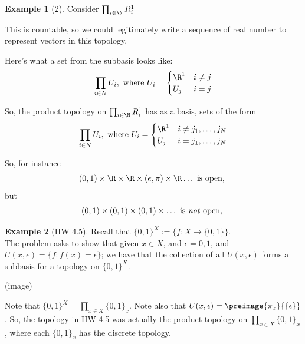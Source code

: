 \documentclass[a5paper]{article}
\theoremstyle{definition}%
\newtheorem*{example*}{Example}
\numberwithin{exercise}{section}
\theoremstyle{remark}%
\begin{document}
\begin{example*}[2]
Consider $\prod_{i\in\N}R^1_i$

This is countable, so we could legitimately write a sequence of real number to represent vectors in this topology. 

Here's what a set from the subbasis looks like:
\[\prod_{i\in N} U_i,\text{ where }U_i=
\begin{cases}
\R^1 & i\neq j\\
U_j & i=j
\end{cases}
\]

So, the product topology on $\prod_{i\in\N}R^1_i$ has as a basis, sets of the form 
\[\prod_{i\in N} U_i,\text{ where }U_i=
\begin{cases}
\R^1 & i\neq j_1, \ldots, j_N\\
U_j & i = j_1, \ldots, j_N
\end{cases}
\]

So, for instance  
$$(0,1) \times \R \times \R \times  (e,\pi) \times \R \ldots \text{ is open, }$$
but 
$$(0,1) \times (0,1) \times (0,1) \times \ldots \text{ is \emph{not} open, }$$

\end{example*}

\begin{example*}[HW 4.5]
Recall that $\{0,1\}^X := \{f:X\to \{0,1\}\}$. \\

The problem asks to show that given $x\in X$, and $\epsilon=0,1$, and $U(x,\epsilon) = \{f:f(x)=\epsilon\}$; we have that the collection of all $U(x,\epsilon)$ forms a subbasis for a topology on $\{0,1\}^X$. 

(image)

Note that $\{0,1\}^X = \prod_{x\in X}\{0,1\}_x$. Note also that $U(x,\epsilon)=\preimage{\pi_x}{\{\epsilon\}}$. So, the topology in HW 4.5 was actually the product topology on $\prod_{x\in X}\{0,1\}_x$, where each $\{0,1\}_x$ has the discrete topology. 
\end{example*}
\end{document}
